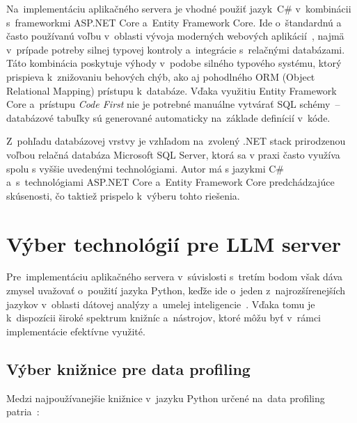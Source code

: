 Na~implementáciu aplikačného servera je vhodné použiť jazyk~C\# v~kombinácii s~frameworkmi ASP.NET Core a~Entity Framework Core. Ide o~štandardnú a často používanú voľbu v~oblasti vývoja moderných webových aplikácií~\cite{top-backend-languages}, najmä v~prípade potreby silnej typovej kontroly a~integrácie s~relačnými databázami. Táto kombinácia poskytuje výhody v~podobe silného typového systému, ktorý prispieva k~znižovaniu behových chýb, ako aj pohodlného ORM (Object Relational Mapping) prístupu k~databáze. Vďaka využitiu Entity Framework Core a~prístupu \textit{Code First} nie je potrebné manuálne vytvárať SQL schémy~-- databázové tabuľky sú generované automaticky na~základe definícií v~kóde.

Z~pohľadu databázovej vrstvy je vzhľadom na~zvolený .NET stack prirodzenou voľbou relačná databáza Microsoft SQL Server, ktorá sa v praxi často využíva spolu s vyššie uvedenými technológiami. Autor má s jazykmi C\# a~s~technológiami ASP.NET Core a~Entity Framework Core predchádzajúce skúsenosti, čo taktiež prispelo k~výberu tohto riešenia.

\section{Výber technológií pre LLM server}

Pre~implementáciu aplikačného servera v~súvislosti s~tretím bodom však dáva zmysel uvažovať o~použití jazyka Python, keďže ide o~jeden z~najrozšírenejších jazykov v~oblasti dátovej analýzy a~umelej inteligencie~\cite{top-data-science-languages}. Vďaka tomu je k~dispozícii široké spektrum knižníc a~nástrojov, ktoré môžu byť v~rámci implementácie efektívne využité.

\subsection{Výber knižnice pre data profiling}

Medzi najpoužívanejšie knižnice v~jazyku Python určené na~data profiling patria~\cite{data-profiling-packages}:

